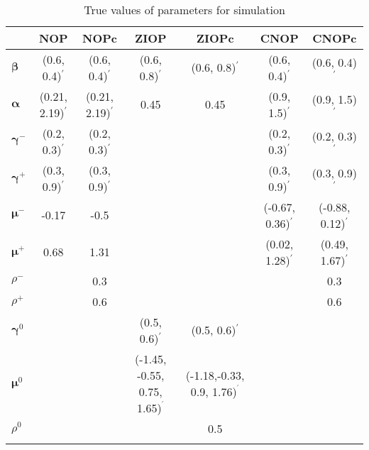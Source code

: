 \documentclass[letterpaper,fleqn,11pt]{article}
\begin{document}
\begin{onehalfspace}

\begin{table}[htbp]
\caption{True values of parameters for simulation}
\label{tab:params}{\tiny \ \centering
\begin{tabular}{lcccccc}
\toprule & NOP & NOPc & ZIOP & ZIOPc & CNOP & CNOPc \\ 
\midrule $\mathbf{\beta }$ & (0.6, 0.4)$^{\prime }$ & (0.6, 0.4)$^{\prime }$
& (0.6, 0.8)$^{\prime }$ & (0.6, 0.8)$^{\prime }$ & (0.6, 0.4)$^{\prime }$ & 
(0.6, 0.4)$^{\prime }$ \\ 
$\mathbf{\alpha }$ & (0.21, 2.19)$^{\prime }$ & (0.21, 2.19)$^{\prime }$ & 
0.45 & 0.45 & (0.9, 1.5)$^{\prime }$ & (0.9, 1.5)$^{\prime }$ \\ 
$\mathbf{\gamma }^{-}$ & (0.2, 0.3)$^{\prime }$ & (0.2, 0.3)$^{\prime }$ & 
&  & (0.2, 0.3)$^{\prime }$ & (0.2, 0.3)$^{\prime }$ \\ 
$\mathbf{\gamma }^{+}$ & (0.3, 0.9)$^{\prime }$ & (0.3, 0.9)$^{\prime }$ & 
&  & (0.3, 0.9)$^{\prime }$ & (0.3, 0.9)$^{\prime }$ \\ 
$\mathbf{\mu }^{-}$ & -0.17 & -0.5 &  &  & (-0.67, 0.36)$^{\prime }$ & 
(-0.88, 0.12)$^{\prime }$ \\ 
$\mathbf{\mu }^{+}$ & 0.68 & 1.31 &  &  & (0.02, 1.28)$^{\prime }$ & (0.49,
1.67)$^{\prime }$ \\ 
$\rho ^{-}$ &  & 0.3 &  &  &  & 0.3 \\ 
$\rho ^{+}$ &  & 0.6 &  &  &  & 0.6 \\ 
$\mathbf{\gamma }^{0}$ &  &  & (0.5, 0.6)$^{\prime }$ & (0.5, 0.6)$^{\prime }
$ &  &  \\ 
$\mathbf{\mu }^{0}$ &  &  & (-1.45, -0.55, 0.75, 1.65)$^{^{\prime }}$ & 
(-1.18,-0.33, 0.9, 1.76)$^{^{\prime }}$ &  &  \\ 
$\rho ^{0}$ &  &  &  & 0.5 &  &  \\ 
\bottomrule &  &  &  &  &  & 
\end{tabular}
}
\end{table}


\end{onehalfspace}
\end{document}
